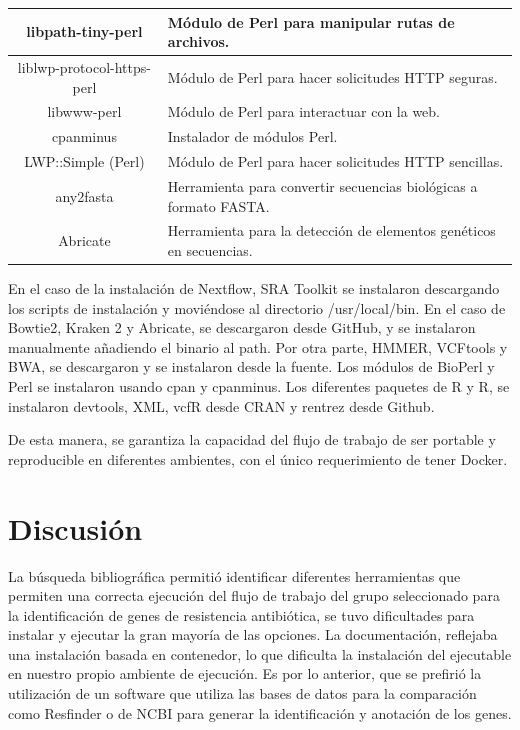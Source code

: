 \documentclass[12pt]{article}
\begin{document}
\begin{longtable}{|c|p{6cm}|}
    \hline
    libpath-tiny-perl & Módulo de Perl para manipular rutas de archivos. \\
    \hline
    liblwp-protocol-https-perl & Módulo de Perl para hacer solicitudes HTTP seguras. \\
    \hline
    libwww-perl & Módulo de Perl para interactuar con la web. \\
    \hline
    cpanminus & Instalador de módulos Perl. \\
    \hline
    LWP::Simple (Perl) & Módulo de Perl para hacer solicitudes HTTP sencillas. \\
    \hline
    any2fasta & Herramienta para convertir secuencias biológicas a formato FASTA. \\
    \hline
    Abricate & Herramienta para la detección de elementos genéticos en secuencias. \\
    \hline
\end{longtable}

En el caso de la instalación de Nextflow, SRA Toolkit se instalaron descargando 
los scripts de instalación y moviéndose al directorio /usr/local/bin. En el caso de Bowtie2, 
Kraken 2 y Abricate, se descargaron desde GitHub, y se instalaron manualmente añadiendo el 
binario al path. Por otra parte, HMMER, VCFtools y BWA, se descargaron y se instalaron 
desde la fuente. Los módulos de BioPerl y Perl se instalaron usando cpan y cpanminus. Los 
diferentes paquetes de R y R, se instalaron devtools, XML, vcfR desde CRAN y rentrez desde 
Github.

De esta manera, se garantiza la capacidad del flujo de trabajo de ser portable y 
reproducible en diferentes ambientes, con el único requerimiento de tener Docker.

\newpage
\section{Discusión}
La búsqueda bibliográfica permitió identificar diferentes herramientas que permiten
 una correcta ejecución del flujo de trabajo del grupo seleccionado para la 
 identificación de genes de resistencia antibiótica, se tuvo dificultades para 
 instalar y ejecutar la gran mayoría de las opciones. La documentación, reflejaba 
 una instalación basada en contenedor, lo que dificulta la instalación del ejecutable 
 en nuestro propio ambiente de ejecución. Es por lo anterior, que se prefirió la utilización 
 de un software que utiliza las bases de datos para la comparación como Resfinder 
 o de NCBI para generar la identificación y anotación de los genes. 
\end{document}
